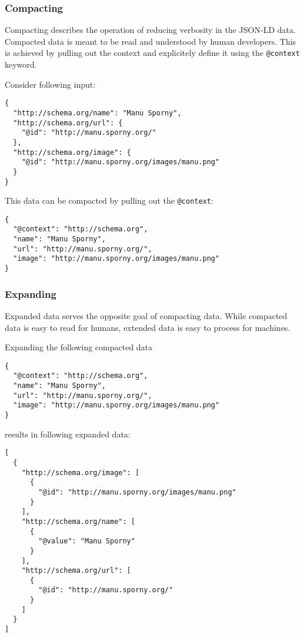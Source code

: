 \subsubsection{Compacting}\label{jsonldcompacting}

Compacting describes the operation of reducing verbosity in the JSON-LD data. Compacted data is meant to be read and understood by human developers. This is achieved by pulling out the context and explicitely define it using the \lstinline{@context} keyword.

Consider following input:

\lstset{language=JSON}
\begin{lstlisting}[caption=Verbose data of a person]
{
  "http://schema.org/name": "Manu Sporny",
  "http://schema.org/url": {
    "@id": "http://manu.sporny.org/"
  },
  "http://schema.org/image": {
    "@id": "http://manu.sporny.org/images/manu.png"
  }
}
\end{lstlisting}

This data can be compacted by pulling out the \lstinline{@context}:

\lstset{language=JSON}
\begin{lstlisting}[caption=Compacted and easy-to-read data of a person]
{
  "@context": "http://schema.org",
  "name": "Manu Sporny",
  "url": "http://manu.sporny.org/",
  "image": "http://manu.sporny.org/images/manu.png"
}
\end{lstlisting}

\subsubsection{Expanding}\label{jsonldextending}

Expanded data serves the opposite goal of compacting data. While compacted data is easy to read for humans, extended data is easy to process for machines.

Expanding the following compacted data

\lstset{language=JSON}
\begin{lstlisting}[caption=Compacted and easy-to-read data of a person]
{
  "@context": "http://schema.org",
  "name": "Manu Sporny",
  "url": "http://manu.sporny.org/",
  "image": "http://manu.sporny.org/images/manu.png"
}
\end{lstlisting}

results in following expanded data:

\lstset{language=JSON}
\begin{lstlisting}[caption=Expanded data of a person that is easy to process for machines]
[
  {
    "http://schema.org/image": [
      {
        "@id": "http://manu.sporny.org/images/manu.png"
      }
    ],
    "http://schema.org/name": [
      {
        "@value": "Manu Sporny"
      }
    ],
    "http://schema.org/url": [
      {
        "@id": "http://manu.sporny.org/"
      }
    ]
  }
]
\end{lstlisting}


